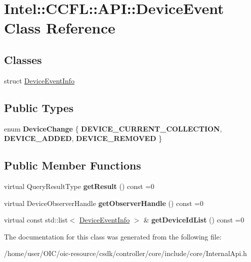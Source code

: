 \hypertarget{classIntel_1_1CCFL_1_1API_1_1DeviceEvent}{}\section{Intel\+:\+:C\+C\+F\+L\+:\+:A\+P\+I\+:\+:Device\+Event Class Reference}
\label{classIntel_1_1CCFL_1_1API_1_1DeviceEvent}
\subsection*{Classes}
\begin{DoxyCompactItemize}
\item 
struct \hyperlink{structIntel_1_1CCFL_1_1API_1_1DeviceEvent_1_1DeviceEventInfo}{Device\+Event\+Info}
\end{DoxyCompactItemize}
\subsection*{Public Types}
\begin{DoxyCompactItemize}
\item 
\hypertarget{classIntel_1_1CCFL_1_1API_1_1DeviceEvent_aa617152a7312db92ac72f7ee184cafec}{}enum {\bfseries Device\+Change} \{ {\bfseries D\+E\+V\+I\+C\+E\+\_\+\+C\+U\+R\+R\+E\+N\+T\+\_\+\+C\+O\+L\+L\+E\+C\+T\+I\+O\+N}, 
{\bfseries D\+E\+V\+I\+C\+E\+\_\+\+A\+D\+D\+E\+D}, 
{\bfseries D\+E\+V\+I\+C\+E\+\_\+\+R\+E\+M\+O\+V\+E\+D}
 \}\label{classIntel_1_1CCFL_1_1API_1_1DeviceEvent_aa617152a7312db92ac72f7ee184cafec}

\end{DoxyCompactItemize}
\subsection*{Public Member Functions}
\begin{DoxyCompactItemize}
\item 
\hypertarget{classIntel_1_1CCFL_1_1API_1_1DeviceEvent_a5e8aca9cc699e7c50c34059f8a04c9c9}{}virtual Query\+Result\+Type {\bfseries get\+Result} () const =0\label{classIntel_1_1CCFL_1_1API_1_1DeviceEvent_a5e8aca9cc699e7c50c34059f8a04c9c9}

\item 
\hypertarget{classIntel_1_1CCFL_1_1API_1_1DeviceEvent_add452ed87e973335020ee980641043fd}{}virtual Device\+Observer\+Handle {\bfseries get\+Observer\+Handle} () const =0\label{classIntel_1_1CCFL_1_1API_1_1DeviceEvent_add452ed87e973335020ee980641043fd}

\item 
\hypertarget{classIntel_1_1CCFL_1_1API_1_1DeviceEvent_aa2ea0c91d70fbfbd2f9f807e74888954}{}virtual const std\+::list$<$ \hyperlink{structIntel_1_1CCFL_1_1API_1_1DeviceEvent_1_1DeviceEventInfo}{Device\+Event\+Info} $>$ \& {\bfseries get\+Device\+Id\+List} () const =0\label{classIntel_1_1CCFL_1_1API_1_1DeviceEvent_aa2ea0c91d70fbfbd2f9f807e74888954}

\end{DoxyCompactItemize}


The documentation for this class was generated from the following file\+:\begin{DoxyCompactItemize}
\item 
/home/user/\+O\+I\+C/oic-\/resource/csdk/controller/core/include/core/Internal\+Api.\+h\end{DoxyCompactItemize}
